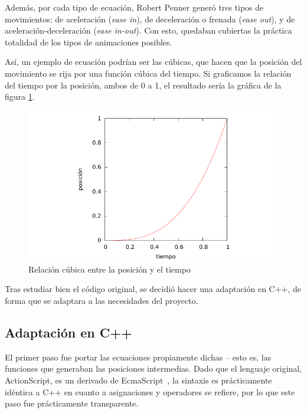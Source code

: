 Además, por cada tipo de ecuación, Robert Penner generó tres tipos de
movimientos: de aceleración (\textit{ease in}), de deceleración o frenada
(\textit{ease out}), y de aceleración-deceleración (\textit{ease in-out}). Con
esto, quedaban cubiertas la práctica totalidad de los tipos de animaciones posibles.

Así, un ejemplo de ecuación podrían ser las cúbicas, que hacen que la posición
del movimiento se rija por una función cúbica del tiempo. Si graficamos la
relación del tiempo por la posición, ambos de 0 a 1, el resultado sería la
gráfica de la figura \ref{fig:ecuacion1}.

\begin{figure}[htp!]
  \centering
  \includegraphics[width=\textwidth]{6_implementacion/imagen_ecuacion1}
  \caption{Relación cúbica entre la posición y el tiempo}
  \label{fig:ecuacion1}
\end{figure}

Tras estudiar bien el código original, se decidió hacer una adaptación en C++,
de forma que se adaptara a las necesidades del proyecto.

\subsection{Adaptación en C++}
El primer paso fue portar las ecuaciones propiamente dichas -- esto es, las
funciones que generaban las posiciones intermedias. Dado que el lenguaje
original, ActionScript, es un derivado de EcmaScript~\cite{Ecmascript}, la
sintaxis es prácticamente idéntica a C++ en cuanto a asignaciones y operadores
se refiere, por lo que este paso fue prácticamente transparente.

